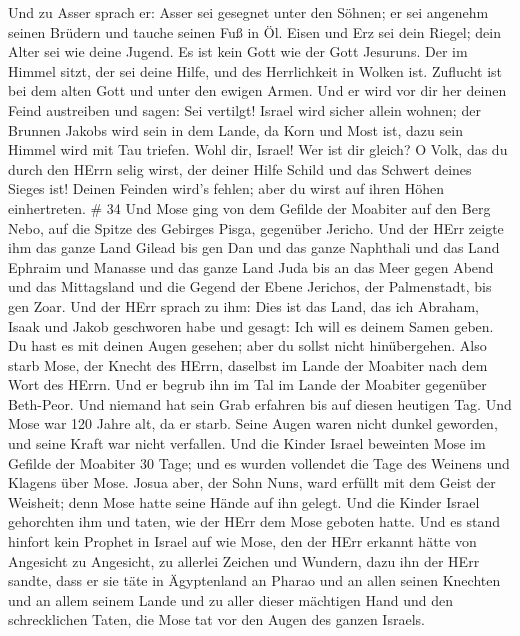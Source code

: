 Und zu Asser sprach er: Asser sei gesegnet unter den Söhnen; er sei
angenehm seinen Brüdern und tauche seinen Fuß in Öl.  Eisen
und Erz sei dein Riegel; dein Alter sei wie deine Jugend. 
Es ist kein Gott wie der Gott Jesuruns. Der im Himmel sitzt, der sei
deine Hilfe, und des Herrlichkeit in Wolken ist.  Zuflucht
ist bei dem alten Gott und unter den ewigen Armen. Und er wird vor dir
her deinen Feind austreiben und sagen: Sei vertilgt! 
Israel wird sicher allein wohnen; der Brunnen Jakobs wird sein in dem
Lande, da Korn und Most ist, dazu sein Himmel wird mit Tau triefen.
 Wohl dir, Israel! Wer ist dir gleich? O Volk, das du durch
den HErrn selig wirst, der deiner Hilfe Schild und das Schwert deines
Sieges ist! Deinen Feinden wird's fehlen; aber du wirst auf ihren Höhen
einhertreten. \# 34  Und Mose ging von dem Gefilde der
Moabiter auf den Berg Nebo, auf die Spitze des Gebirges Pisga, gegenüber
Jericho. Und der HErr zeigte ihm das ganze Land Gilead bis gen Dan
 und das ganze Naphthali und das Land Ephraim und Manasse
und das ganze Land Juda bis an das Meer gegen Abend  und das
Mittagsland und die Gegend der Ebene Jerichos, der Palmenstadt, bis gen
Zoar.  Und der HErr sprach zu ihm: Dies ist das Land, das
ich Abraham, Isaak und Jakob geschworen habe und gesagt: Ich will es
deinem Samen geben. Du hast es mit deinen Augen gesehen; aber du sollst
nicht hinübergehen.  Also starb Mose, der Knecht des HErrn,
daselbst im Lande der Moabiter nach dem Wort des HErrn.  Und
er begrub ihn im Tal im Lande der Moabiter gegenüber Beth-Peor. Und
niemand hat sein Grab erfahren bis auf diesen heutigen Tag. 
Und Mose war 120 Jahre alt, da er starb. Seine Augen waren nicht dunkel
geworden, und seine Kraft war nicht verfallen.  Und die
Kinder Israel beweinten Mose im Gefilde der Moabiter 30 Tage; und es
wurden vollendet die Tage des Weinens und Klagens über Mose.
 Josua aber, der Sohn Nuns, ward erfüllt mit dem Geist der
Weisheit; denn Mose hatte seine Hände auf ihn gelegt. Und die Kinder
Israel gehorchten ihm und taten, wie der HErr dem Mose geboten hatte.
 Und es stand hinfort kein Prophet in Israel auf wie Mose,
den der HErr erkannt hätte von Angesicht zu Angesicht,  zu
allerlei Zeichen und Wundern, dazu ihn der HErr sandte, dass er sie täte
in Ägyptenland an Pharao und an allen seinen Knechten und an allem
seinem Lande  und zu aller dieser mächtigen Hand und den
schrecklichen Taten, die Mose tat vor den Augen des ganzen Israels.
